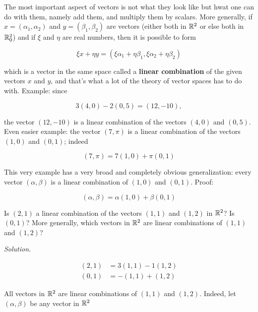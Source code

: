 The most important aspect of vectors is not what they look like but hwat one can do with them, namely add them, and multiply them by scalars. More generally, if $x = (\alpha_1, \alpha_2)$ and $y = (\beta_1, \beta_2)$ are vectors (either both in $\mathbb{R}^2$ or else both in $\mathbb{R}^2_0$) and if $\xi$ and $\eta$ are real numbers, then it is possible to form

\begin{equation}
    \xi x + \eta y = (\xi \alpha_1 + \eta \beta_1, \xi \alpha_2 + \eta \beta_2)
\end{equation}

which is a vector in the same space called a \textbf{linear combination} of the given vectors $x$ and $y$, and that's what a lot of the theory of vector spaces has to do with. Example: since

\begin{equation}
    3(4,0) - 2(0,5) = (12,-10),
\end{equation}

the vector $(12,-10)$ is a linear combination of the vectors $(4,0)$ and $(0,5)$. Even easier example: the vector $(7, \pi)$ is a linear combination of the vectors $(1,0)$ and $(0,1)$; indeed

\begin{equation}
    (7, \pi) = 7(1,0) + \pi (0,1)
\end{equation}

This very example has a very broad and completely obvious generalization: every vector $(\alpha, \beta)$ is a linear combination of $(1,0)$ and $(0,1)$. Proof:

\begin{equation}
    (\alpha, \beta) = \alpha(1,0) + \beta(0,1)
\end{equation}

\begin{problem}
Is $(2,1)$ a linear combination of the vectors $(1,1)$ and $(1,2)$ in $\mathbb{R}^2$? Is $(0,1)$? More generally, which vectors in $\mathbb{R}^2$ are linear combinations of $(1,1)$ and $(1,2)$?
\end{problem}

\textit{Solution.}

\begin{align}
    (2,1) & = 3(1,1) - 1(1,2) \\
    (0,1) & = -(1,1) + (1,2)
\end{align}

All vectors in $\mathbb{R}^2$ are linear combinations of $(1,1)$ and $(1,2)$. Indeed, let $(\alpha, \beta)$ be any vector in $\mathbb{R}^2$

